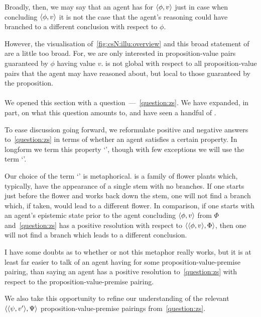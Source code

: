 \begin{note}
  Broadly, then, we may say that an agent has \csVed{} for \(\langle \phi, v \rangle\) just in case when concluding \(\langle \phi, v \rangle\) it is not the case that the agent's reasoning could have branched to a different conclusion with respect to \(\phi\).

  However, the visualisation of~\autoref{fig:csN:illu:overview} and this broad statement of \csN{} are a little too broad.
  For, we are only interested in proposition-value pairs guaranteed by \(\phi\) having value \(v\).
  \csN{} is not global with respect to all proposition-value pairs that the agent may have reasoned about, but local to those guaranteed by the proposition.
\end{note}

\paragraph*{}

\begin{note}
  We opened this section with a question~---~\autoref{question:zs}.
  We have expanded, in part, on what this question amounts to, and have seen a handful of .

  To ease discussion going forward, we reformulate positive and negative answers to~\autoref{question:zs} in terms of whether an agent satisfies a certain property.
  In longform we term this property `', though with few exceptions we will use the term `'.

  Our choice of the term `' is metaphorical.
   is a family of flower plants which, typically, have the appearance of a single stem with no branches.
  If one starts just before the flower and works back down the stem, one will not find a branch which, if taken, would lead to a different flower.
  In comparison, if one starts with an agent's epistemic state prior to the agent concluding \(\langle \phi, v \rangle\) from \(\Phi\) and~\autoref{question:zs} has a positive resolution with respect to \(\langle \langle \phi, v \rangle, \Phi \rangle\), then one will not find a branch which leads to a different conclusion.

  I have some doubts as to whether or not this metaphor really works, but it is at least far easier to talk of an agent having \zs{} for some proposition-value-premise pairing, than saying an agent has a positive resolution to~\autoref{question:zs} with respect to the proposition-value-premise pairing.

  We also take this opportunity to refine our understanding of the relevant \(\langle \langle \psi, v' \rangle, \Psi \rangle\) proposition-value-premise pairings from~\autoref{question:zs}.
\end{note}

